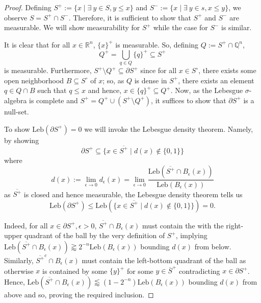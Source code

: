 \documentclass{article}
\begin{document}
\begin{proof}
Defining \(S^+ := \{x \mid \exists \ y \in S, y \le x\}\) and \(S^- := \{x \mid \exists \ y \in s, x \le y\}\), we
observe \(S = S^+ \cap S^-\). Therefore, it is sufficient to show that \(S^+\) and \(S^-\) are measurable.
We will show measurability for \(S^+\) while the case for \(S^-\) is similar.

It is clear that for all \(x \in \mathbb{R}^n\), \(\{x\}^+\) is measurable. So, defining \(Q := S^+ \cap \mathbb{Q}^n\),
\[Q^+ = \bigcup_{q \in Q} \{q\}^+ \subseteq S^+\]
is measurable. Furthermore, \(S^+ \setminus Q^+ \subseteq \partial S^+\) since for all \(x \in S^\circ\), there exists some
open neighborhood \(B \subseteq S^\circ\) of \(x\); so, as \(Q\) is dense in \(S^+\), there exists an element
\(q \in Q \cap B\) such that \(q \le x\) and hence, \(x \in \{q\}^+ \subseteq Q^+\). Now, as the Lebesgue \(\sigma\)-algebra is
complete and \(S^+ = Q^+ \cup (S^+ \setminus Q^+)\), it suffices to show that \(\partial S^+\) is a null-set.

To show \(\text{Leb}(\partial S^+) = 0\) we will invoke the Lebesgue density theorem. Namely, by showing
\[\partial S^+ \subseteq \{x \in \overline{S^+} \mid d(x) \notin \{0, 1\}\}\]
where
\[d(x) := \lim_{\epsilon \to 0} d_\epsilon(x) = \lim_{\epsilon \to 0}
    \frac{\text{Leb}(\overline{S^+} \cap B_\epsilon(x))}{\text{Leb}(B_\epsilon(x))}\]
as \(\overline{S^+}\) is closed and hence measurable, the Lebesgue density theorem tells us
\[\text{Leb}(\partial S^+) \le \text{Leb}(\{x \in \overline{S^+} \mid d(x) \notin \{0, 1\}\}) = 0.\]

Indeed, for all \(x \in \partial S^+, \epsilon > 0\), \(\overline{S^+} \cap B_\epsilon(x)\) must contain
the with the right-upper quadrant of the ball by the very definition of \(S^+\), implying
\(\text{Leb}(\overline{S^+} \cap B_\epsilon(x)) \gtrapprox 2^{-n} \text{Leb}(B_\epsilon(x))\) bounding
\(d(x)\) from below. Similarly, \(\overline{S^+}^c \cap B_\epsilon(x)\) must contain the left-bottom
quadrant of the ball as otherwise \(x\) is contained by some \(\{y\}^+\) for some \(y \in \overline{S}^+\)
contradicting \(x \in \partial S^+\). Hence, \(\text{Leb}(\overline{S^+} \cap B_\epsilon(x)) \lessapprox
(1 - 2^{-n}) \text{Leb}(B_\epsilon(x))\) bounding \(d(x)\) from above and so, proving the required
inclusion.

\end{proof}
\end{document}
